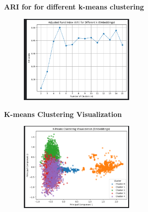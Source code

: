\documentclass{article}
\begin{document}
\textbf{ARI for for different k-means clustering}
\begin{figure}[H]
    \centering
    \includegraphics[width=0.5\textwidth]{Autoencoder_ari.png}
    \label{fig:autoencoder_ari}
\end{figure}

\textbf{K-means Clustering Visualization}
\begin{figure}[H]
    \centering
    \includegraphics[width=0.5\textwidth]{Autoencoder_kmeans.png}
    \label{fig:autoencoder_kmeans}
\end{figure}
\end{document}
